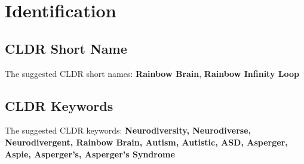 \section{Identification}

\subsection{CLDR Short Name}
The suggested CLDR short names: \textbf{Rainbow Brain}, \textbf{Rainbow Infinity Loop}


\subsection{CLDR Keywords}
The suggested CLDR keywords: \textbf{Neurodiversity, Neurodiverse, Neurodivergent, Rainbow Brain, Autism, Autistic, ASD, Asperger, Aspie, Asperger's, Asperger's Syndrome}
